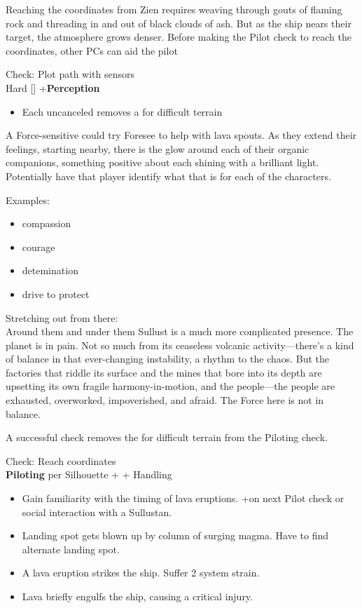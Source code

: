 \documentclass{book}
\newcommand{\df}{\difficulty}
\newcommand{\stb}{\setback}
\begin{document}
\begin{multicols}{2}
Reaching the coordinates from Zien requires weaving through gouts of flaming rock and threading in and out of black clouds of ash. But as the ship nears their target, the atmosphere grows denser. Before making the Pilot check to reach the coordinates, other PCs can aid the pilot

Check: Plot path with sensors\\
Hard [\df\df\df] +\setback  \textbf{Perception}
\begin{itemize}
\item \success Each uncanceled \success removes a \setback for difficult terrain
\end{itemize}

A Force-sensitive could try Foresee to help with lava spouts. As they extend their feelings, starting nearby, there is the glow around each of their organic companions, something positive about each shining with a brilliant light. Potentially have that player identify what that is for each of the characters.

Examples:
\begin{itemize}
    \item compassion
    \item courage
    \item detemination
    \item drive to protect
\end{itemize}

Stretching out from there: \\
Around them and under them Sullust is a much more complicated presence. The planet is in pain. Not so much from its ceaseless volcanic activity—there’s a kind of balance in that ever-changing instability, a rhythm to the chaos. But the factories that riddle its surface and the mines that bore into its depth are upsetting its own fragile harmony-in-motion, and the people—the people are exhausted, overworked, impoverished, and afraid. The Force here is not in balance.

A successful check removes the \setback\setback\setback for difficult terrain from the Piloting check.

Check: Reach coordinates\\
\textbf{Piloting} \difficulty per Silhouette + \stb\stb\stb + Handling 

\begin{itemize}
	\item \advantage Gain familiarity with the timing of lava eruptions.  +\boost on next Pilot check or social interaction with a Sullustan.
	\item \failure Landing spot gets blown up by column of surging magma. Have to find alternate landing spot.
	\item \threat \threat A lava eruption strikes the ship.  Suffer 2 system strain.
	\item \despair Lava briefly engulfs the ship, causing a critical injury.
\end{itemize}



\end{multicols}
\end{document}
